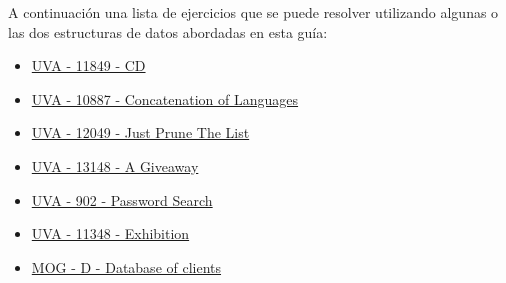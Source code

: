 A continuación una lista de ejercicios que se puede resolver utilizando algunas o las dos estructuras de datos abordadas en esta guía:

\begin{itemize}

	\item \href{https://onlinejudge.org/index.php?option=com_onlinejudge&Itemid=8&category=226&page=show_problem&problem=2949}{UVA - 11849 - CD}
	\item \href{https://onlinejudge.org/index.php?option=com_onlinejudge&Itemid=8&category=20&page=show_problem&problem=1828}{UVA - 10887 - Concatenation of Languages}
	\item \href{https://onlinejudge.org/index.php?option=com_onlinejudge&Itemid=8&category=242&page=show_problem&problem=3200}{UVA - 12049 - Just Prune The List}
	\item \href{https://onlinejudge.org/index.php?option=com_onlinejudge&Itemid=8&category=871&page=show_problem&problem=5070}{UVA - 13148 - A Giveaway}
	\item \href{https://onlinejudge.org/index.php?option=com_onlinejudge&Itemid=8&category=11&page=show_problem&problem=843}{UVA - 902 - Password Search}
	\item \href{https://onlinejudge.org/index.php?option=com_onlinejudge&Itemid=8&category=25&page=show_problem&problem=2323}{UVA - 11348 - Exhibition}
	\item \href{https://matcomgrader.com/problem/9545/database-of-clients/}{MOG - D - Database of clients}
\end{itemize}